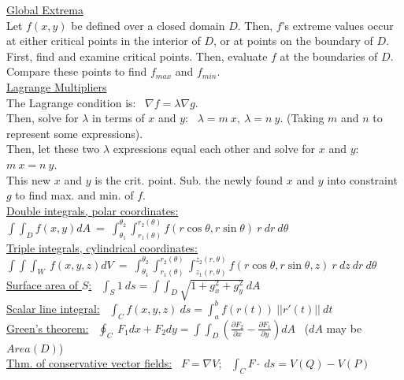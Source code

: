 \documentclass[10pt]{extarticle}
\begin{document}
\underline{Global Extrema}\\
Let $f(x,y)$ be defined over a closed domain $D$. Then, $f$'s extreme values occur at either critical points in the interior of $D$, or at points on the boundary of $D$.\\
First, find and examine critical points. Then, evaluate $f$ at the boundaries of $D$. Compare these points to find $f_{max}$ and $f_{min}$.\\

\underline{Lagrange Multipliers}\\
The Lagrange condition is: \ $\nabla f = \lambda \nabla g$.\\
Then, solve for $\lambda$ in terms of $x$ and $y$: \ $\lambda = m \ x, \ \lambda = n \ y$.
(Taking $m$ and $n$ to represent some expressions).\\
Then, let these two $\lambda$ expressions equal each other and solve for $x$ and $y$: \ $m \ x = n \ y$.\\
This new $x$ and $y$ is the crit. point. Sub. the newly found $x$ and $y$ into constraint $g$ to find max. and min. of $f$.\\

\noindent
\underline{Double integrals, polar coordinates:} \ $\int \int_D f(x,y) dA \ = \ \int_{\theta_1}^{\theta_2} \int_{r_1(\theta)}^{r_2(\theta)} f(r \cos \theta, r \sin \theta) \ r \ dr \ d \theta$\\
\underline{Triple integrals, cylindrical coordinates:} \ $\int \int \int_W \ f(x,y,z) dV \ = \  \int_{\theta_1}^{\theta_2} \int_{r_1(\theta)}^{r_2(\theta)} \int_{z_1(r,\theta)}^{z_2(r,\theta)} f(r \cos \theta, r \sin \theta,z) \ r \ dz \ dr \ d \theta$\\
\noindent
\underline{Surface area of $S$:} \ $\int_{S} 1 \ ds = \int \int_D \sqrt{1 + g_x^2+g_y^2} \ dA$\\
\noindent
\underline{Scalar line integral:} \ $\int_C f(x,y,z) \ ds = \int_a^b f(r(t)) \ ||r'(t)|| \ dt$\\
\underline{Green's theorem:} \ $\oint_C \ F_1 dx + F_2 dy = \int \int_D \left( \frac{\partial F_2}{\partial x} - \frac{\partial F_1}{\partial y}\right) dA$ \ ($dA$ may be $Area(D)$)\\
\underline{Thm. of conservative vector fields:} \ $F = \nabla V$; \ $\int_C F \cdot \ ds = V(Q) - V(P)$
\end{document}
